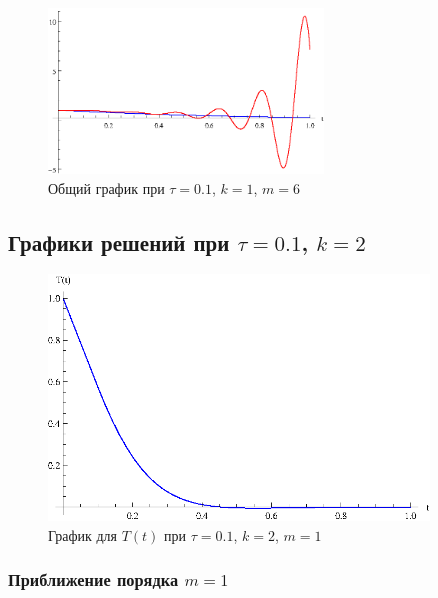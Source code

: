 \begin{figure}[h]
\begin{center}
\includegraphics[width=0.65\textwidth]{./3_results/1_13.eps}
\end{center}
\caption{Общий график при $\tau=0.1$, $k=1$, $m=6$}
\end{figure}

\newpage

\subsection{Графики решений при $\tau=0.1$, $k=2$}

\vfill

\begin{figure}[h]
\begin{center}
\includegraphics[width=0.9\textwidth]{./3_results/2_1.eps}
\end{center}
\caption{График для $T(t)$ при $\tau=0.1$, $k=2$, $m=1$}
\end{figure}

\vfill

\newpage

\subsubsection{Приближение порядка $m=1$}

